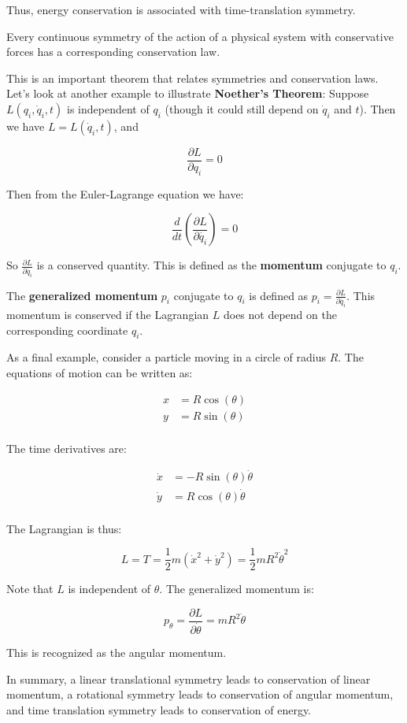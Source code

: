 Thus, energy conservation is associated with time-translation symmetry.

\begin{definition}
 Every continuous symmetry of the action of a physical system with conservative forces has a corresponding conservation law.
\end{definition}

This is an important theorem that relates symmetries and conservation laws.
Let's look at another example to illustrate \textbf{Noether's Theorem}: Suppose 
$L(q_i, \dot{q}_i, t)$ is independent of $q_i$ (though it could still depend on 
$\dot{q}_i$ and $t$). Then we have $L = L(\dot{q}_i, t)$, and

\[
    \frac{\partial L}{\partial q_i} = 0
\]

Then from the Euler-Lagrange equation we have:

\[
    \frac{d}{dt} \left(\frac{\partial L}{\partial \dot{q_i}}\right) = 0
\]

So $\frac{\partial L}{\partial \dot{q_i}}$ is a conserved quantity. This is defined as 
the \textbf{momentum} conjugate to $q_i$.

\begin{definition}
    The \textbf{generalized momentum} $p_i$ conjugate to $q_i$ is defined as $p_i = \frac{\partial L}{\partial \dot{q_i}}$.
    This momentum is conserved if the Lagrangian $L$ does not depend on the corresponding coordinate $q_i$.
\end{definition}

As a final example, consider a particle moving in a circle of radius $R$. The equations 
of motion can be written as:

\begin{align*}
    x&=R\cos(\theta)\\
    y&=R\sin(\theta)\\
\end{align*}

The time derivatives are:

\begin{align*}
    \dot{x}&=-R\sin(\theta)\dot{\theta}\\
    \dot{y}&=R\cos(\theta)\dot{\theta}\\
\end{align*}

The Lagrangian is thus:

\[
    L = T = \frac{1}{2} m (\dot{x}^2+\dot{y}^2) = \frac{1}{2} m R^2 \dot{\theta}^2
\]

Note that $L$ is independent of $\theta$. The generalized momentum is:

\[
    p_\theta =  \frac{\partial L}{\partial\dot{\theta}} = m R^2 \dot{\theta}
\]

This is recognized as the angular momentum.

In summary, a linear translational symmetry leads to conservation of linear momentum, a 
rotational symmetry leads to conservation of angular momentum, and time translation 
symmetry leads to conservation of energy.